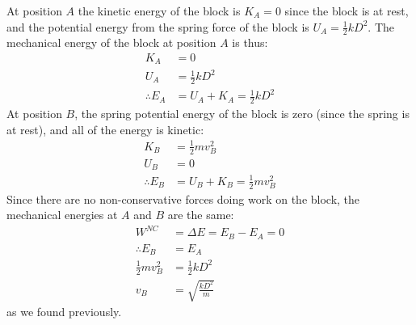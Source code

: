 \begin{example}
At position $A$ the kinetic energy of the block is $K_A=0$ since the block is at rest, and the potential energy from the spring force of the block is $U_A=\frac{1}{2}kD^2$. The mechanical energy of the block at position $A$ is thus:
\begin{align*}
K_A&=0\\
U_A&=\frac{1}{2}kD^2\\
\therefore E_A &= U_A + K_A = \frac{1}{2}kD^2
\end{align*}
At position $B$, the spring potential energy of the block is zero (since the spring is at rest), and all of the energy is kinetic:
\begin{align*}
K_B&=\frac{1}{2}mv_B^2\\
U_B&=0\\
\therefore E_B &= U_B+K_B=\frac{1}{2}mv_B^2
\end{align*}
Since there are no non-conservative forces doing work on the block, the mechanical energies at $A$ and $B$ are the same:
\begin{align*}
W^{NC}&=\Delta E=E_B-E_A= 0\\
\therefore E_B&=E_A\\
\frac{1}{2}mv_B^2&= \frac{1}{2}kD^2\\
 v_B &= \sqrt{\frac{kD^2}{m}}
\end{align*}
as we found previously.
\end{example}

